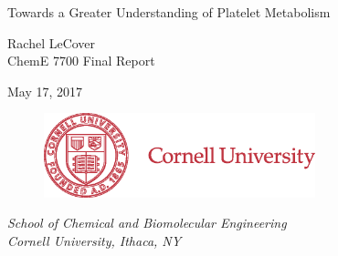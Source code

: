 \documentclass[11pt]{article}
\begin{document}
\begin{titlepage}
  \begin{center}
    {\LARGE{Towards a Greater Understanding of Platelet Metabolism}}\par
    \vspace{5em}
    { \Large{Rachel LeCover} \\
    \vspace{1em}
    { \large{ChemE 7700 Final Report}}\par
     \vspace{1em}
    { \large{May 17, 2017}}\par
    \begin{figure}[h]
    \vspace{3em}
       \centering
       \includegraphics[width=0.7\textwidth]{../figures/CULogo187}
       \end{figure}
    \vspace{2em} \large{ \textit{School of Chemical and Biomolecular Engineering \\ \vspace{0.5em} Cornell University, Ithaca, NY}}}\par
    \vspace{3em}
  \end{center}
\end{titlepage}
\pagebreak

\setcounter{page}{1}
\end{document}
